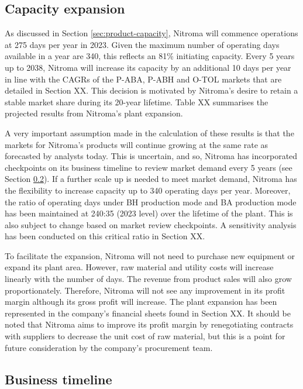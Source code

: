 \subsection{Capacity expansion}
\label{sec:expansion}
As discussed in Section \ref{sec:product-capacity}, Nitroma will commence operations at 275 days per year in 2023. Given the maximum number of operating days available in a year are 340, this reflects an 81\% initiating capacity. Every 5 years up to 2038, Nitroma will increase its capacity by an additional 10 days per year in line with the CAGRs of the P-ABA, P-ABH and O-TOL markets that are detailed in Section XX.  This decision is motivated by Nitroma’s desire to retain a stable market share during its 20-year lifetime. Table XX summarises the projected results from Nitroma’s plant expansion.

A very important assumption made in the calculation of these results is that the markets for Nitroma’s products will continue growing at the same rate as forecasted by analysts today. This is uncertain, and so, Nitroma has incorporated checkpoints on its business timeline to review market demand every 5 years (see Section \ref{sec:business-timeline}). If a further scale up is needed to meet market demand, Nitroma has the flexibility to increase capacity up to 340 operating days per year. Moreover, the ratio of operating days under BH production mode and BA production mode has been maintained at 240:35 (2023 level) over the lifetime of the plant. This is also subject to change based on market review checkpoints. A sensitivity analysis has been conducted on this critical ratio in Section XX.

To facilitate the expansion, Nitroma will not need to purchase new equipment or expand its plant area. However, raw material and utility costs will increase linearly with the number of days. The revenue from product sales will also grow proportionately. Therefore, Nitroma will not see any improvement in its profit margin although its gross profit will increase. The plant expansion has been represented in the company’s financial sheets found in Section XX. It should be noted that Nitroma aims to improve its profit margin by renegotiating contracts with suppliers to decrease the unit cost of raw material, but this is a point for future consideration by the company's procurement team. 

\subsection{Business timeline}
\label{sec:business-timeline}

